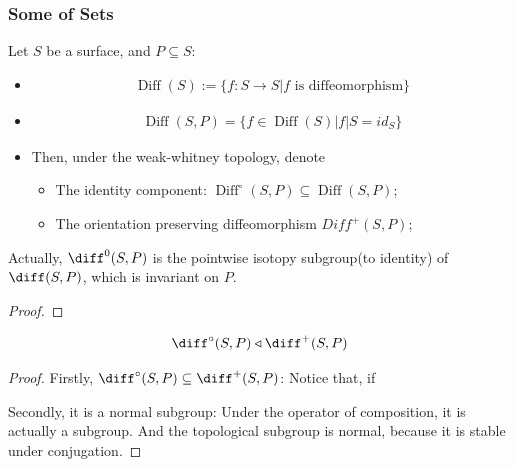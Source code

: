 \documentclass[Total.tex]{subfiles}
\begin{document}
			\subsubsection{Some of Sets}
			\begin{Def}
				Let $S$ be a surface, and $P\subseteq S$:
				\begin{itemize}
					\item \begin{gather*}
						\operatorname{Diff}(S):=\{f:S\rightarrow S|f\mbox{ is diffeomorphism}\}
					\end{gather*}
					\item 
					\begin{gather*}
						\operatorname{Diff}(S,P)=\{f\in \operatorname{Diff}(S)|f|S=id_S\}
					\end{gather*}
					\item Then, under the weak-whitney topology, denote
					\begin{itemize}
						\item The identity component: $\operatorname{Diff}^\circ(S,P)\subseteq \operatorname{Diff}(S,P)$;
						\item The orientation preserving diffeomorphism $Diff^+(S,P)$; 
					\end{itemize}
				\end{itemize}
			\end{Def} 
			
			\begin{lemma}
				Actually, $\diff^0(S,P)$ is the pointwise isotopy subgroup(to identity) of $\diff(S,P)$, which is invariant on $P$. 
			\end{lemma}
			\begin{proof}
				
			\end{proof}
			
			\begin{lemma}
				\begin{gather*}
					\diff^\circ(S,P)\triangleleft \diff^+(S,P)
				\end{gather*}
			\end{lemma}
			\begin{proof}
				Firstly, $\diff^\circ(S,P)\subseteq \diff^+(S,P)$: Notice that, if 
				
				Secondly, it is a normal subgroup: Under the operator of composition, it is actually a subgroup. And the topological subgroup is normal, because it is stable under conjugation. 
			\end{proof}
			
\end{document}
